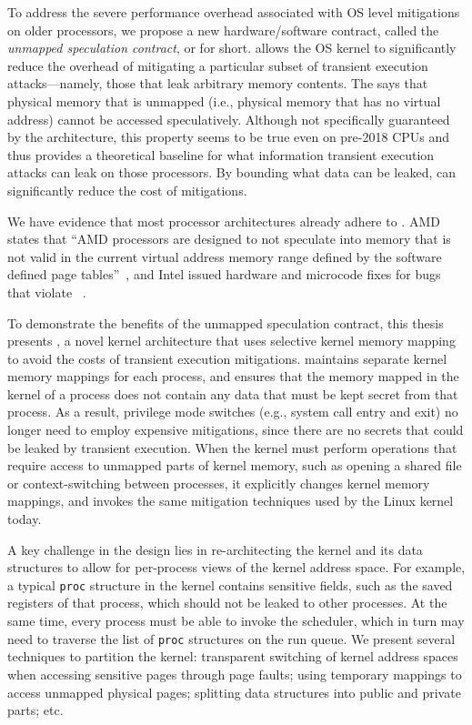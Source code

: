 
To address the severe performance overhead associated with OS level mitigations on older processors, we propose a new hardware/software contract, called the \emph{unmapped speculation contract}, or \contract{} for short.
\contract{} allows the OS kernel
to significantly reduce the overhead of mitigating a particular subset
of transient execution attacks---namely, those that leak arbitrary
memory contents.  
The \contract{} says that physical memory that is unmapped (i.e., physical memory that has no virtual address) cannot be accessed speculatively. 
Although not specifically guaranteed by the architecture, this property seems to be true even on pre-2018 CPUs and thus provides a theoretical baseline for what information transient execution attacks can leak on those processors.
By bounding what data can be leaked, \contract can significantly reduce the cost of mitigations.

We have evidence that most processor architectures already adhere to \contract. AMD
states that ``AMD processors are designed to not speculate into memory
that is not valid in the current virtual address memory range defined
by the software defined page tables''~\cite[pg. 2]{amd:speculation},
and Intel issued hardware and microcode fixes for bugs that violate
\contract~\cite{intel:meltdown, intel:l1tf}.

To demonstrate the benefits of the unmapped speculation contract,
this thesis presents \sys{}, a novel kernel architecture that uses
selective kernel memory mapping to avoid the costs of transient execution
mitigations.  \sys{} maintains separate kernel memory mappings for each
process, and ensures that the memory mapped in the kernel of a process
does not contain any data that must be kept secret from that process.
As a result, privilege mode switches (e.g., system call entry and exit)
no longer need to employ expensive mitigations, since there are no
secrets that could be leaked by transient execution.  When the \sys{}
kernel must perform operations that require access to unmapped parts
of kernel memory, such as opening a shared file or context-switching
between processes, it explicitly changes kernel memory mappings, and
invokes the same mitigation techniques used by the Linux kernel today.

A key challenge in the \sys design lies in re-architecting the kernel
and its data structures to allow for per-process views of the
kernel address space.  For example, a typical \texttt{proc} structure in
the kernel contains sensitive fields, such as the saved registers of that
process, which should not be leaked to other processes.  At the same time,
every process must be able to invoke the scheduler, which in turn may
need to traverse the list of \texttt{proc} structures on the run queue.
We present several techniques to partition the kernel:
transparent switching of kernel address spaces when accessing sensitive
pages through page faults; using temporary mappings to access unmapped
physical pages; splitting data structures into public and private
parts; etc.

